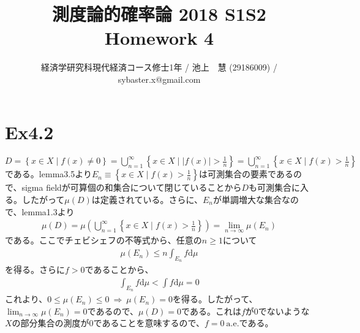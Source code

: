 \documentclass{article}
\begin{document}
\title{測度論的確率論 2018 S1S2 \\ 
Homework 4}
\author{経済学研究科現代経済コース修士1年 / 池上　慧 (29186009) / sybaster.x@gmail.com}
\maketitle

\section{Ex4.2}
 $D = \left\{ x \in X \mid f(x) \neq 0 \right\} = \bigcup_{n = 1}^{\infty} \left\{ x\in X \mid |f(x)| > \frac{1}{n} \right\} = \bigcup_{n = 1}^{\infty} \left\{ x\in X \mid f(x) > \frac{1}{n} \right\}$
である。lemma3.5より$E_n \equiv \left\{ x\in X \mid f(x) > \frac{1}{n} \right\} $は可測集合の要素であるので、sigma fieldが可算個の和集合について閉じていることから$D$も可測集合に入る。したがって$\mu(D)$は定義されている。さらに、$E_n$が単調増大な集合なので、lemma1.3より
\begin{align*}
	\mu(D) = \mu \left(\bigcup_{n = 1}^{\infty} \left\{ x\in X \mid f(x) > \frac{1}{n} \right\}\right) = \lim_{n\to \infty} \mu(E_n)
\end{align*}
である。ここでチェビシェフの不等式から、任意の$n \geq 1$について
\begin{align*}
	\mu(E_n) \leq n \int_{E_n} f \mathrm{d}\mu
\end{align*}
を得る。さらに$f > 0$であることから、
\begin{align*}
	\int_{E_n} f \mathrm{d}\mu < \int f \mathrm{d}\mu  = 0
\end{align*}
これより、$0\leq \mu(E_n) \leq 0 \ \Rightarrow\ \mu(E_n) = 0$を得る。したがって、$\lim_{n\to \infty} \mu(E_n) = 0$であるので、$\mu(D) = 0$である。これは$f$が$0$でないような$X$の部分集合の測度が$0$であることを意味するので、$f = 0\ \text{a.e.}$である。
\end{document}

